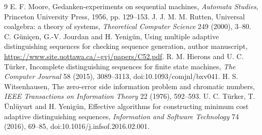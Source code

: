 \documentclass[11pt]{article}
\theoremstyle{definition}
\begin{document}
\begin{thebibliography}{9}
 E. F. Moore, Gedanken-experiments on sequential machines,
\emph{Automata Studies}, Princeton University Press, 1956, pp. 129--153.
 J. J. M. M. Rutten, Universal coalgebra: a theory of systems,
\emph{Theoretical Computer Science} 249 (2000), 3--80.
 C. G\"uni\c cen, G.-V. Jourdan and H. Yenig\"un,
Using multiple adaptive distinguishing sequences for checking sequence
generation, author manuscript, \url{https://www.site.uottawa.ca/~gvj/papers/C52.pdf}.
 R. M. Hierons and U. C. T\"urker, Incomplete distinguishing
sequences for finite state machines, \emph{The Computer Journal} 58 (2015),
3089--3113, doi:10.1093/comjnl/bxv041.
 H. S. Witsenhausen, The zero-error side information
problem and chromatic numbers, \emph{IEEE Transactions on Information Theory}
22 (1976), 592--593.
 U. C. T\"urker, T. \"Unl\"uyurt and H. Yenig\"un,
Effective algorithms for constructing minimum cost adaptive distinguishing
sequences, \emph{Information and Software Technology} 74 (2016), 69--85,
doi:10.1016/j.infsof.2016.02.001.
\end{thebibliography}
\end{document}
